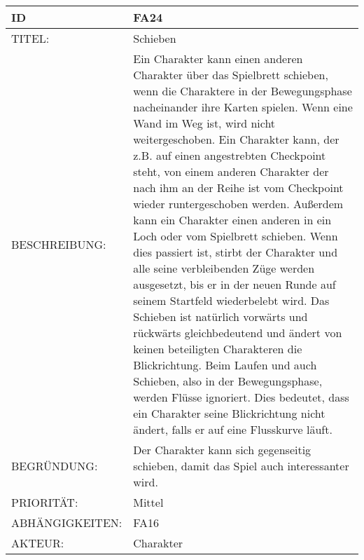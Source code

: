 \documentclass{uulm-assignment}
\begin{document}
    \begin{tabularx}{\textwidth}{|l|X |} \hline
        \textbf{ID} & \textbf{FA24} \\
        \hline
        TITEL: &  Schieben\\
        \hline
        BESCHREIBUNG: & Ein Charakter kann einen anderen Charakter über das Spielbrett schieben, wenn die Charaktere in der Bewegungsphase nacheinander ihre Karten spielen. Wenn eine Wand im Weg ist, wird nicht weitergeschoben. Ein Charakter kann, der z.B. auf einen angestrebten Checkpoint steht, von einem anderen Charakter der nach ihm an der Reihe ist vom Checkpoint wieder runtergeschoben werden. \newline Außerdem kann ein Charakter einen anderen in ein Loch oder vom Spielbrett schieben. Wenn dies passiert ist, stirbt der Charakter und alle seine verbleibenden Züge
werden ausgesetzt, bis er in der neuen Runde auf seinem Startfeld wiederbelebt wird. Das Schieben
ist natürlich vorwärts und rückwärts gleichbedeutend und ändert von keinen beteiligten Charakteren
die Blickrichtung. Beim Laufen und auch Schieben, also in der Bewegungsphase, werden Flüsse ignoriert. Dies bedeutet,
dass ein Charakter seine Blickrichtung nicht ändert, falls er auf eine Flusskurve läuft.
        \\
        \hline
        BEGRÜNDUNG: & Der Charakter kann sich gegenseitig schieben, damit das Spiel auch interessanter wird. \\
        \hline
        PRIORITÄT: & Mittel\\
        \hline
        ABHÄNGIGKEITEN: & FA16\\
        \hline
        AKTEUR: & Charakter\\
        \hline
    \end{tabularx}
    
\end{document}
